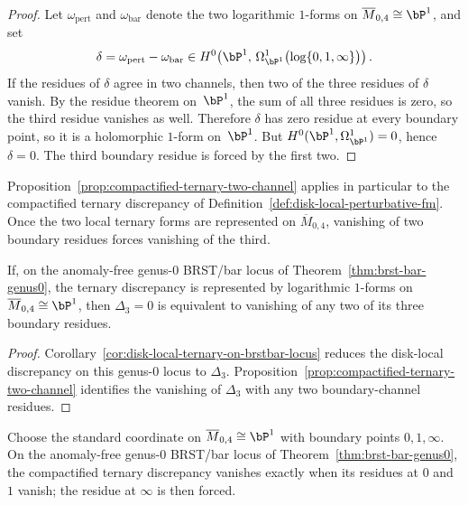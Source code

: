 \begin{proof}
Let $\omega_{\mathrm{pert}}$ and $\omega_{\mathrm{bar}}$ denote the two
logarithmic $1$-forms on $\overline{M}_{0,4} \cong \bP^1$, and set
\[
\delta = \omega_{\mathrm{pert}} - \omega_{\mathrm{bar}}
\in H^0\!\left(\bP^1,\,
\Omega^1_{\bP^1}\bigl(\log\{0,1,\infty\}\bigr)\right).
\]
If the residues of $\delta$ agree in two channels, then two of the
three residues of $\delta$ vanish. By the residue theorem on~$\bP^1$,
the sum of all three residues is zero, so the third residue vanishes as
well. Therefore $\delta$ has zero residue at every boundary point, so
it is a holomorphic $1$-form on~$\bP^1$. But
$H^0(\bP^1,\Omega^1_{\bP^1}) = 0$, hence $\delta = 0$.
The third boundary residue is forced by the first two.
\end{proof}

\begin{remark}
Proposition~\ref{prop:compactified-ternary-two-channel} applies in
particular to the compactified ternary discrepancy of
Definition~\ref{def:disk-local-perturbative-fm}. Once the two local
ternary forms are represented on $\overline{M}_{0,4}$, vanishing of
two boundary residues forces vanishing of the third.
\end{remark}

\begin{corollary}
\label{cor:genus0-compactified-ternary-two-channel}
If, on the anomaly-free genus-$0$ BRST/bar locus of
Theorem~\ref{thm:brst-bar-genus0}, the ternary discrepancy is
represented by logarithmic \(1\)-forms on
$\overline{M}_{0,4} \cong \bP^1$, then \(\Delta_3=0\) is equivalent
to vanishing of any two of its three boundary residues.
\end{corollary}

\begin{proof}
Corollary~\ref{cor:disk-local-ternary-on-brstbar-locus} reduces the
disk-local discrepancy on this genus-$0$ locus to \(\Delta_3\).
Proposition~\ref{prop:compactified-ternary-two-channel} identifies the
vanishing of \(\Delta_3\) with any two boundary-channel residues.
\end{proof}

\begin{corollary}
\label{cor:genus0-standard-chart-two-residues}
Choose the standard coordinate on
$\overline{M}_{0,4} \cong \bP^1$ with boundary points
$0,1,\infty$. On the anomaly-free genus-$0$ BRST/bar locus of
Theorem~\ref{thm:brst-bar-genus0}, the compactified ternary discrepancy
vanishes exactly when its residues at $0$ and~$1$ vanish; the residue at
$\infty$ is then forced.
\end{corollary}

